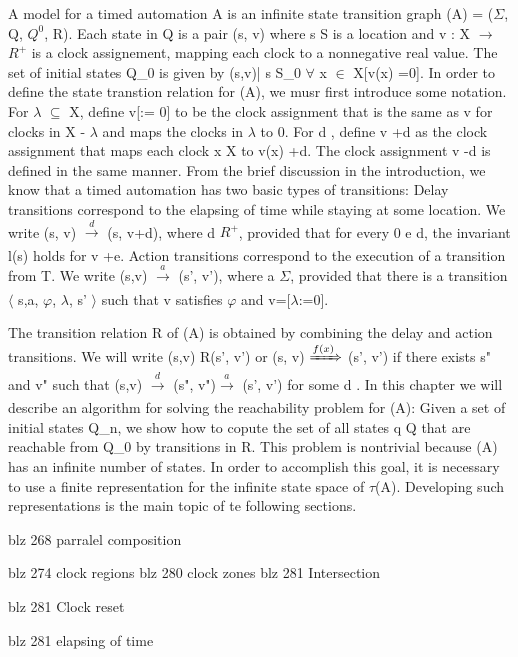 A model for a timed automation A is an infinite state transition graph \tau(A) = ($\Sigma$, Q, $Q^{0}$, R). Each state in Q is a pair (s, v) where s \in S is a location and v : X $\rightarrow$  $R^{+}$ is a clock assignement, mapping each clock to a nonnegative real value. The set of initial states Q_0 is given by {(s,v)| s \in S_0 \wedge $\forall$ x  $\in$  X[v(x) =0]}.
In order to define the state transtion relation for \tau(A), we musr first introduce some notation. For $\lambda$ $\subseteq$ X, define v[\lambda := 0] to be the clock assignment that is the same as v for clocks in X - $\lambda$ and maps the clocks in $\lambda$ to 0. For d \in \Re, define v +d as the clock assignment that maps each clock x \in X to v(x) +d. The clock assignment v -d is defined in the same  manner.
From the brief discussion in the introduction, we know that a timed automation has two basic types of transitions:
Delay transitions correspond to the elapsing of time while staying at some location. We write (s, v) $\xrightarrow[]{d}$ (s, v+d), where d \in  $R^{+}$, provided that for every 0 \leq e \leq d, the invariant	l(s) holds for v +e.
Action transitions correspond to the execution of a transition	 from T. We write (s,v) $\xrightarrow[]{a}$ (s', v'), where a \in $\Sigma$, provided that there is a transition $\langle$ s,a, $\varphi$, $\lambda$, s' $\rangle$ such that v satisfies $\varphi$ and v=[$\lambda$:=0].

The transition relation R of \tau(A) is obtained by combining the delay and action transitions. We will write (s,v) R(s', v') or (s, v) $\xRightarrow[]{f(x)}$   (s', v') if there exists s" and v" such that (s,v) $\xrightarrow[]{d}$ (s", v")$\xrightarrow[]{a}$ (s', v') for some d \in \Re.
In this chapter we will describe an algorithm for solving the reachability problem for \tau(A): Given a set of initial states Q_n, we show how to copute the set of all states q \in Q that are reachable from Q_0 by transitions in R. This problem is nontrivial because \tau (A) has an infinite number of states. In order to accomplish this goal, it is necessary to use a finite representation for the infinite state space of $\tau$(A). Developing such representations is the main topic of te following sections.

blz 268 parralel composition

blz 274 clock regions
blz 280 clock zones
blz 281 Intersection

blz 281 Clock reset


blz 281 elapsing of time



